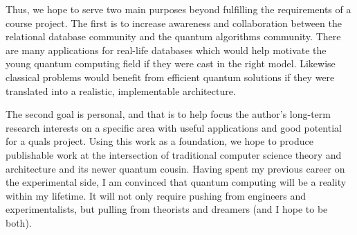 \documentclass{toc}
\theoremstyle{plain}
\theoremstyle{definition}
\begin{document}
Thus, we hope to serve two main purposes beyond fulfilling the requirements
of a course project. The first is to increase awareness and collaboration
between the relational database community and the quantum algorithms
community. There are many applications for real-life databases
which would help motivate the young quantum computing field if they were
cast in the right model. Likewise classical problems would
benefit from efficient quantum solutions if they were translated into a
realistic, implementable architecture.

The second goal is personal, and that is to help focus the author's
long-term research interests on a specific area with useful applications
and good potential for a quals project.
Using this work as a foundation, we hope to produce
publishable work at the intersection of traditional computer science theory
and architecture and its newer quantum cousin. Having spent my previous
career on the experimental side, I am convinced that quantum computing will
be a reality within my lifetime. It will not only require pushing from
engineers and experimentalists, but pulling from theorists and dreamers
(and I hope to be both).



\end{document}

